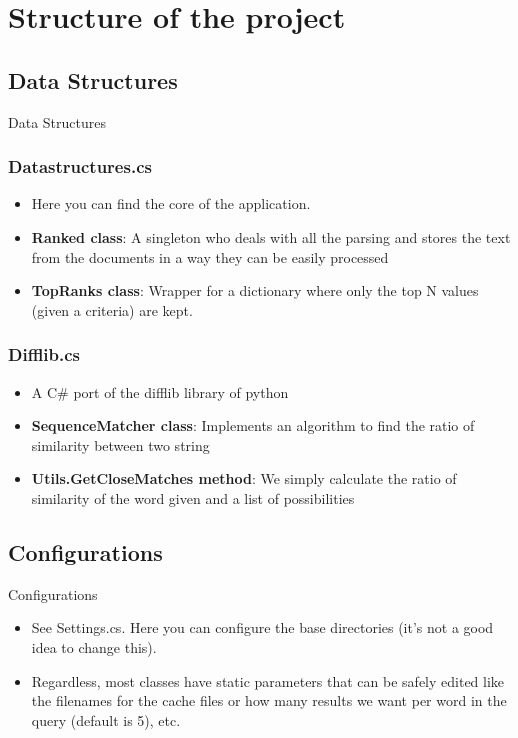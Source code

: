 \section{Structure of the project}

\subsection{Data Structures}
\begin{frame}[fragile]{Data Structures}
    \subsubsection{Datastructures.cs}
        \begin{itemize}
            \item{Here you can find the core of the application.}
            \item{\textbf{Ranked class}: A singleton who deals with all the parsing and stores the text from the documents in a way they can be easily processed}
            \item{\textbf{TopRanks class}: Wrapper for a dictionary where only the top N values (given a criteria) are kept.}
        \end{itemize}
    
    \subsubsection{Difflib.cs}
        \begin{itemize}
            \item{A C\# port of the difflib library of python}
            \item{\textbf{SequenceMatcher class}: Implements an algorithm to find the ratio of similarity between two string}
            \item{\textbf{Utils.GetCloseMatches method}: We simply calculate the ratio of similarity of the word given and a list of possibilities}
        \end{itemize}
   
\end{frame}

\subsection{Configurations}
\begin{frame}[fragile]{Configurations}
    \begin{itemize}
        \item{See Settings.cs. Here you can configure the base directories (it's not a good idea to change this).}
        \item{Regardless, most classes have static parameters that can be safely edited like the filenames for the cache files or how many results we want per word in the query (default is 5), etc.}
     \end{itemize}
\end{frame}
